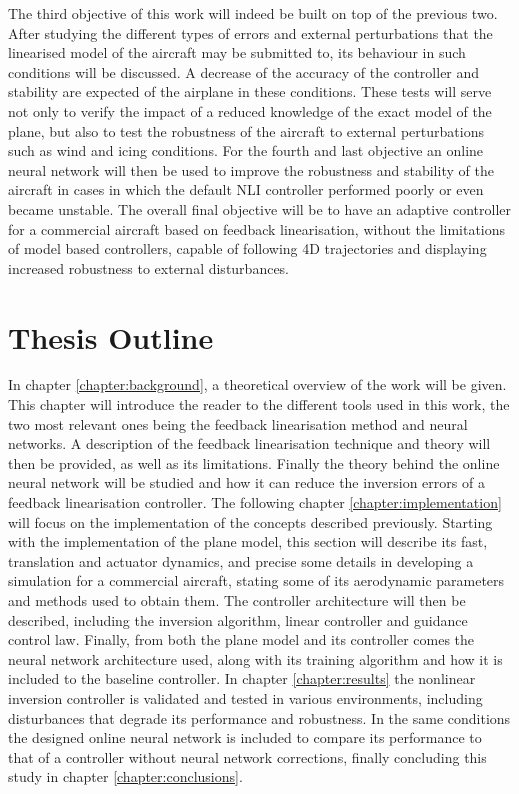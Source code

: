 The third objective of this work will indeed be built on top of the previous two. After studying the different types of errors and external perturbations that the linearised model of the aircraft may be submitted to, its behaviour in such conditions will be discussed. A decrease of the accuracy of the controller and stability are expected of the airplane in these conditions.
These tests will serve not only to verify the impact of a reduced knowledge of the exact model of the plane, but also to test the robustness of the aircraft to external perturbations such as wind and icing conditions. For the fourth and last objective an online neural network will then be used to improve the robustness and stability of the aircraft in cases in which the default NLI controller performed poorly or even became unstable. The overall final objective will be to have an adaptive controller for a commercial aircraft based on feedback linearisation, without the limitations of model based controllers, capable of following 4D trajectories and displaying increased robustness to external disturbances. 






\section{Thesis Outline}
\label{section:outline}

In chapter \ref{chapter:background}, a theoretical overview of the work will be given. This chapter will introduce the reader to the different tools used in this work, the two most relevant ones being the feedback linearisation method and neural networks. A description of the feedback linearisation technique and theory will then be provided, as well as its limitations. Finally the theory behind the online neural network will be studied and how it can reduce the inversion errors of a feedback linearisation controller.
The following chapter \ref{chapter:implementation} will focus on the implementation of the concepts described previously. Starting with the implementation of the plane model, this section will describe its fast, translation and actuator dynamics, and precise some details in developing a simulation for a commercial aircraft, stating some of its aerodynamic parameters and methods used to obtain them. The controller architecture will then be described, including the inversion algorithm, linear controller and guidance control law. Finally, from both the plane model and its controller comes the neural network architecture used, along with its training algorithm and how it is included to the baseline controller. In chapter \ref{chapter:results} the nonlinear inversion controller is validated and tested in various environments, including disturbances that degrade its performance and robustness. In the same conditions the designed online neural network is included to compare its performance to that of a controller without neural network corrections, finally concluding this study in chapter \ref{chapter:conclusions}.


